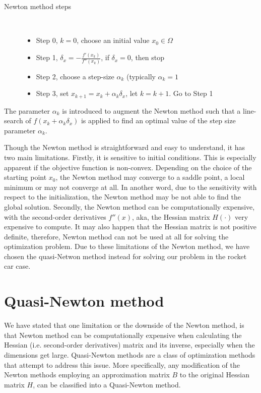 \begin{description}
	\item[Newton method steps]\ 
	\begin{itemize}
		\item Step 0, $k=0$, choose an initial value $x_0 \in \Omega$ 
		\item Step 1, $\delta_x  = - \frac{ f'(x_k)}{f''(x_k)}$, if $\delta_x =0$, then stop
		\item Step 2, choose a step-size $\alpha_k$ (typically $\alpha_k =1$
		\item Step 3, set $x_{k+1}  = x_k + \alpha_k \delta_x $, let $k= k+1$. Go to Step 1
	\end{itemize}
\end{description}

The parameter $\alpha_k$ is introduced to augment the Newton method such that a line-search of $f(x_k + \alpha_k \delta_x)$ is applied to find an optimal value of the step size parameter $\alpha_k$. 

Though the Newton method is straightforward and easy to understand, it has two main limitations. Firstly, it is sensitive to initial conditions. This is especially apparent if the objective function is non-convex. Depending on the choice of the starting point $x_0$, the Newton method may converge to a saddle point, a local minimum or may not converge at all. In another word, due to the sensitivity with respect to the initialization, the Newton method may be not able to find the global solution. Secondly, the Newton method can be computationally expensive, with the second-order derivatives $f''(x)$, aka, the Hessian matrix $H(\cdot)$ very expensive to compute. It may also happen that the Hessian matrix is not positive definite, therefore, Newton method can not be used at all for solving the optimization problem. Due to these limitations of the Newton method, we have chosen the quasi-Netwon method instead for solving our problem in the rocket car case. 

\section{Quasi-Newton method}
We have stated that one limitation or the downside of the Newton method, is that Newton method can be computationally expensive when calculating the Hessian (i.e. second-order derivatives)  matrix and its inverse, especially when the dimensions get large. Quasi-Newton methods are a class of optimization methods that attempt to address this issue. More specifically, any modification of the Newton methods employing an approximation matrix $B$ to the original Hessian matrix $H$, can be classified into a Quasi-Newton method. 

